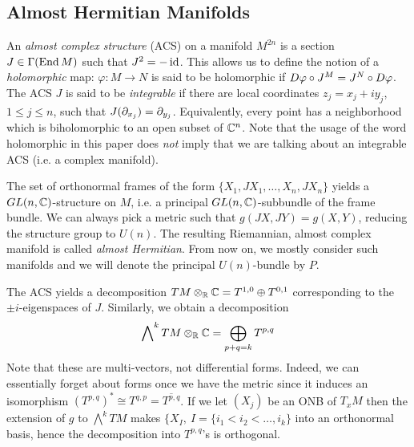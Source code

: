 \documentclass{scrartcl}
\begin{document}
\subsection{Almost Hermitian Manifolds}

An \emph{almost complex structure} (ACS) on a manifold $M^{2n}$ is a section $J\in \Gamma(\operatorname{End} M)$ such that $J^2=-\operatorname{id}$. This allows us to define the notion of a \emph{holomorphic} map: $\varphi:M\to N$ is said to be holomorphic if $D\varphi\circ J^M=J^N\circ D \varphi$. The ACS $J$ is said to be \emph{integrable} if there are local coordinates $z_j=x_j+iy_j$, $1\leq j\leq n$, such that $J(\partial_{x_j})=\partial_{y_j}$. Equivalently, every point has a neighborhood which is biholomorphic to an open subset of $\mathbb{C}^n$. Note that the usage of the word holomorphic in this paper does \emph{not} imply that we are talking about an integrable ACS (i.e. a complex manifold). 

\medskip

The set of orthonormal frames of the form $\{X_1,JX_1,\dots,X_n,JX_n\}$ yields a $GL(n,\mathbb{C})$-structure on $M$, i.e. a principal $GL(n,\mathbb{C})$-subbundle of the frame bundle. We can always pick a metric such that $g(JX,JY)=g(X,Y)$, reducing the structure group to $U(n)$. The resulting Riemannian, almost complex manifold is called \emph{almost Hermitian}. From now on, we mostly consider such manifolds and we will denote the principal $U(n)$-bundle by $P$.

\medskip

The ACS yields a decomposition $TM\otimes_{\mathbb{R}} \mathbb{C}=T^{1,0}\oplus T^{0,1}$ corresponding to the $\pm i$-eigenspaces of $J$. Similarly, we obtain a decomposition 
\begin{equation*}
	\bigwedge\nolimits^k TM\otimes_{\mathbb{R}} \mathbb{C}=\bigoplus_{p+q=k}T^{p,q}
\end{equation*}
Note that these are multi-vectors, not differential forms. Indeed, we can essentially forget about forms once we have the metric since it induces an isomorphism $(T^{p,q})^*\cong T^{q,p}=\overline{T^{p,q}}$. If we let $(X_j)$ be an ONB of $T_xM$ then the extension of $g$ to $\bigwedge^kTM$ makes $\{X_I,\ I=\{i_1<i_2<\dots,i_k\}$ into an orthonormal basis, hence the decomposition into $T^{p,q}$'s is orthogonal.
\end{document}
